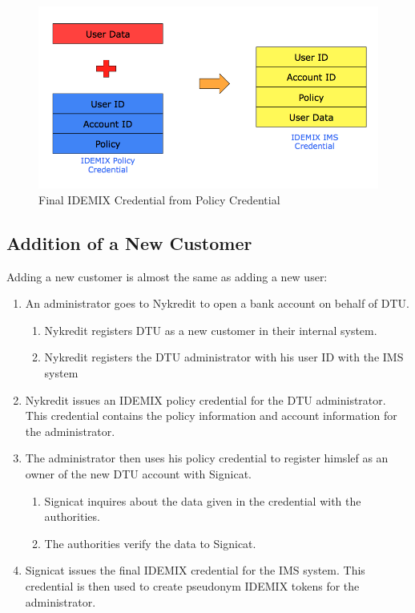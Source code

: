 \begin{figure}[h]
	\centering
	\includegraphics[width=\textwidth]{figures/Final}
	\caption{Final IDEMIX Credential from Policy Credential}
	\label{fig:Final}
\end{figure}
\FloatBarrier
\subsection{Addition of a New Customer}
Adding a new customer is almost the same as adding a new user:
\begin{enumerate}
	\item An administrator goes to Nykredit to open a bank account on behalf of DTU. 
	\begin{enumerate}
		\item Nykredit registers DTU as a new customer in their internal system.
		\item Nykredit registers the DTU administrator with his user ID with the IMS system
	\end{enumerate}
	\item Nykredit issues an IDEMIX policy credential for the DTU administrator. This credential contains the policy information and account information for the administrator.
	\item The administrator then uses his policy credential to register himslef as an owner of the new DTU account with Signicat. 
	\begin{enumerate}
		\item Signicat inquires about the data given in the credential with the authorities.
		\item The authorities verify the data to Signicat.
	\end{enumerate}
	\item Signicat issues the final IDEMIX credential for the IMS system. This credential is then used to create pseudonym IDEMIX tokens for the administrator. 
\end{enumerate}
